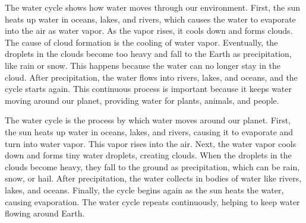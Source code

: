 \documentclass[12pt]{article}
\begin{document}
\begin{tcolorbox}[colframe=black!60, colback=white, 
coltitle=black, colbacktitle=black!15, fonttitle=\bfseries\Large, 
title=Text: The Importance of the Water Cycle, halign title=center, left=10pt, right=10pt, top=10pt, bottom=15pt]

The water cycle shows how water moves through our environment. First, the sun heats up water in oceans, lakes, and rivers, which causes the water to evaporate into the air as water vapor. As the vapor rises, it cools down and forms clouds. The cause of cloud formation is the cooling of water vapor. Eventually, the droplets in the clouds become too heavy and fall to the Earth as precipitation, like rain or snow. This happens because the water can no longer stay in the cloud. After precipitation, the water flows into rivers, lakes, and oceans, and the cycle starts again. This continuous process is important because it keeps water moving around our planet, providing water for plants, animals, and people.

 
\end{tcolorbox}

\vspace{2cm}
\begin{tcolorbox}[colframe=black!60, colback=white, 
coltitle=black, colbacktitle=black!15, fonttitle=\bfseries\Large, 
title=Text: The Water Cycle Process, halign title=center, left=10pt, right=10pt, top=10pt, bottom=15pt]

The water cycle is the process by which water moves around our planet. First, the sun heats up water in oceans, lakes, and rivers, causing it to evaporate and turn into water vapor. This vapor rises into the air. Next, the water vapor cools down and forms tiny water droplets, creating clouds. When the droplets in the clouds become heavy, they fall to the ground as precipitation, which can be rain, snow, or hail. After precipitation, the water collects in bodies of water like rivers, lakes, and oceans. Finally, the cycle begins again as the sun heats the water, causing evaporation. The water cycle repeats continuously, helping to keep water flowing around Earth.

 
\end{tcolorbox}


\vspace{1em}
\end{document}
